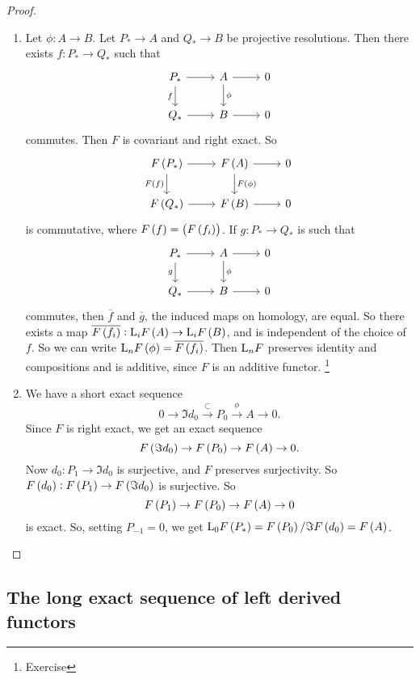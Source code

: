 \begin{proof}
\begin{enumerate}
\pagebreak

\item Let $ \phi : A \to B $. Let $ P_* \to A $ and $ Q_* \to B $ be projective resolutions. Then there exists $ f : P_* \to Q_* $ such that
$$
\begin{tikzcd}
P_* \arrow{r} \arrow[swap]{d}{f} & A \arrow{r} \arrow{d}{\phi} & 0 \\
Q_* \arrow{r} & B \arrow{r} & 0
\end{tikzcd}
$$
commutes. Then $ F $ is covariant and right exact. So
$$
\begin{tikzcd}
F\br{P_*} \arrow{r} \arrow[swap]{d}{F\br{f}} & F\br{A} \arrow{r} \arrow{d}{F\br{\phi}} & 0 \\
F\br{Q_*} \arrow{r} & F\br{B} \arrow{r} & 0
\end{tikzcd}
$$
is commutative, where $ F\br{f} = \br{F\br{f_i}} $. If $ g : P_* \to Q_* $ is such that
$$
\begin{tikzcd}
P_* \arrow{r} \arrow[swap]{d}{g} & A \arrow{r} \arrow{d}{\phi} & 0 \\
Q_* \arrow{r} & B \arrow{r} & 0
\end{tikzcd}
$$
commutes, then $ \overline{f} $ and $ \overline{g} $, the induced maps on homology, are equal. So there exists a map $ \overline{F\br{f_i}} : \L_iF\br{A} \to \L_iF\br{B} $, and is independent of the choice of $ f $. So we can write $ \L_nF\br{\phi} = \overline{F\br{f_i}} $. Then $ \mathrm{L}_nF $ preserves identity and compositions and is additive, since $ F $ is an additive functor. \footnote{Exercise}
\item We have a short exact sequence
$$ 0 \to \Im d_0 \xrightarrow{\subset} P_0 \xrightarrow{\phi} A \to 0. $$
Since $ F $ is right exact, we get an exact sequence
$$ F\br{\Im d_0} \to F\br{P_0} \to F\br{A} \to 0. $$
Now $ d_0 : P_1 \to \Im d_0 $ is surjective, and $ F $ preserves surjectivity. So $ F\br{d_0} : F\br{P_1} \to F\br{\Im d_0} $ is surjective. So
$$ F\br{P_1} \to F\br{P_0} \to F\br{A} \to 0 $$
is exact. So, setting $ P_{-1} = 0 $, we get $ \L_0F\br{P_*} = F\br{P_0} / \Im F\br{d_0} = F\br{A} $.
\end{enumerate}
\end{proof}

\pagebreak

\subsection{The long exact sequence of left derived functors}


